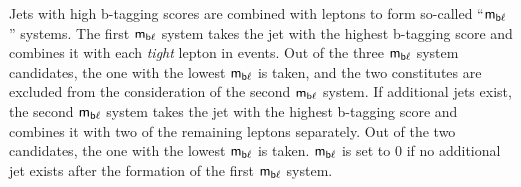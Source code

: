 Jets with high b-tagging scores are combined with leptons to form so-called ``$\textsf{m}_{\textsf{b}\ell}$'' systems. The first $\textsf{m}_{\textsf{b}\ell}$ system takes the jet with the highest b-tagging score and combines it with each \emph{tight} lepton in events. Out of the three $\textsf{m}_{\textsf{b}\ell}$ system candidates, the one with the lowest $\textsf{m}_{\textsf{b}\ell}$ is taken, and the two constitutes are excluded from the consideration of the second $\textsf{m}_{\textsf{b}\ell}$ system. If additional jets exist, the second $\textsf{m}_{\textsf{b}\ell}$ system takes the jet with the highest b-tagging score and combines it with two of the remaining leptons separately. Out of the two candidates, the one with the lowest $\textsf{m}_{\textsf{b}\ell}$ is taken. $\textsf{m}_{\textsf{b}\ell}$ is set to 0 if no additional jet exists after the formation of the first $\textsf{m}_{\textsf{b}\ell}$ system.